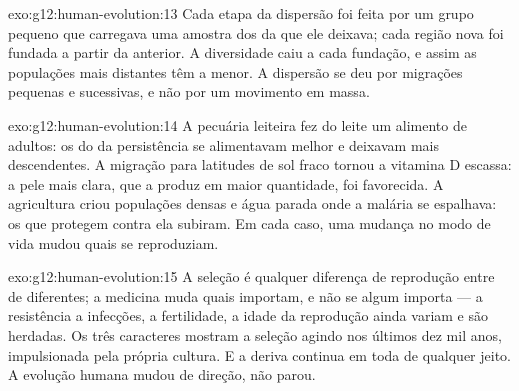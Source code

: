 \begin{solution}{exo:g12:human-evolution:13}
Cada etapa da dispersão foi feita por um grupo pequeno que carregava
uma amostra dos  da  que ele deixava; cada região nova
foi fundada a partir da anterior. A diversidade caiu a cada fundação, e
assim as populações mais distantes têm a menor. A dispersão se deu por
migrações pequenas e sucessivas, e não por um movimento em massa.
\end{solution}

\begin{solution}{exo:g12:human-evolution:14}
A pecuária leiteira fez do leite um alimento de adultos: os 
do  da persistência se alimentavam melhor e deixavam mais
descendentes. A migração para latitudes de sol fraco tornou a vitamina
D escassa: a pele mais clara, que a produz em maior quantidade, foi
favorecida. A agricultura criou populações densas e água parada onde a
malária se espalhava: os  que protegem contra ela subiram. Em cada
caso, uma mudança no modo de vida mudou quais  se reproduziam.
\end{solution}

\begin{solution}{exo:g12:human-evolution:15}
A seleção é qualquer diferença de reprodução entre  de 
diferentes; a medicina muda quais  importam, e não se algum
importa --- a resistência a infecções, a fertilidade, a idade da
reprodução ainda variam e são herdadas. Os três caracteres mostram a
seleção agindo nos últimos dez mil anos, impulsionada pela própria
cultura. E a deriva continua em toda  de qualquer jeito. A
evolução humana mudou de direção, não parou.
\end{solution}

